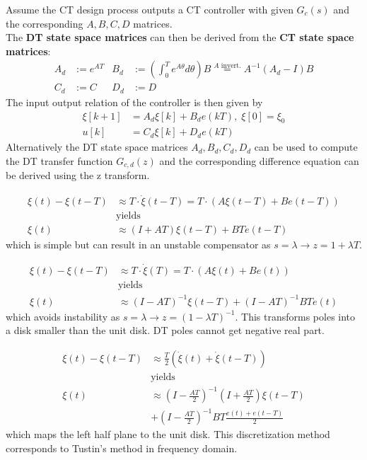 Assume the CT design process outputs a CT controller with given $G_c(s)$ and the corresponding $A, B, C, D$ matrices.\\
The \textbf{DT state space matrices} can then be derived from the \textbf{CT state space matrices}:
\begin{align*}
    A_d & :=e^{AT} & B_d & :=\left(\int_0^T {e^{A\theta}}d\theta\right)B \overset{A \text{ invert.}}{=} A^{-1}\left(A_d-I\right)B \\
    C_d & :=C      & D_d & :=D
\end{align*}
The input output relation of the controller is then given by
\begin{align*}
    \xi[k+1] & =A_d \xi[k]+B_d e(kT), \; \xi[0]=\xi_0 \\
    u[k]     & =C_d \xi[k]+D_d e(kT)
\end{align*}
Alternatively the DT state space matrices $A_d, B_d, C_d, D_d$ can be used to compute the DT transfer function $G_{c,d}(z)$ and the corresponding difference equation can be derived using the z transform.

\begin{align*}
    \xi(t)-\xi(t-T) & \approx T\cdot\dot{\xi}(t-T) =T\cdot(A\xi(t-T)+Be(t-T)) \\
                    & \text{yields}                                           \\
    \xi(t)          & \approx(I+AT)\xi(t-T)+BTe(t-T)
\end{align*}
which is simple but can result in an unstable compensator as $s=\lambda \rightarrow z=1+\lambda T$.

\begin{align*}
    \xi(t)-\xi(t-T) & \approx T\cdot\dot{\xi}(T) =T\cdot(A\xi(t)+Be(t)) \\
                    & \text{yields}                                     \\
    \xi(t)          & \approx{(I-AT)}^{-1}\xi(t-T)+{(I-AT)}^{-1}BTe(t)
\end{align*}
which avoids instability as $s=\lambda \rightarrow z={(1-\lambda T)}^{-1}$. This transforms poles into a disk smaller than the unit disk. DT poles cannot get negative real part.

\begin{align*}
    \xi(t)-\xi(t-T) & \approx \frac T2\left(\dot{\xi}(t)+\dot{\xi}(t-T)\right)                     \\
                    & \text{yields}                                                                \\
    \xi(t)          & \approx{\left(I-\frac{AT}{2}\right)}^{-1}\left(I+\frac{AT}{2}\right)\xi(t-T) \\
                    & +{\left(I-\frac{AT}{2}\right)}^{-1}BT\frac{e(t)+e(t-T)}2
\end{align*}
which maps the left half plane to the unit disk. This discretization method corresponds to Tustin's method in frequency domain.